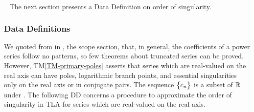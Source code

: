 \documentclass[12pt]{article}
\newcommand{\tref}[1]{TM\ref{#1}}
\begin{document}
~\newline
The next section presents a Data Definition on order of singularity.

\subsubsection{Data Definitions}\label{sec_datadef}

We quoted from \cite{chang1982} in , the scope section, that,
in general, the coefficients of a power series follow no patterns, so few theorems about truncated
series can be proved. However, \tref{TM-primary-poles} asserts that
series which are real-valued on the real axis can have poles,
logarithmic branch points, and essential singularities only on the real axis or in conjugate pairs.
The sequence $\bigl\{ {c_n} \bigr\}$ is a subset of $\mathbb{R}$ under .
The following DD concerns a procedure to approximate the order of singularity in TLA for
series which are real-valued on the real axis.
~\newline
\end{document}
